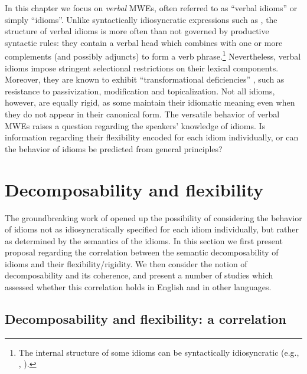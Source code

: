 \documentclass[output=paper]{langsci/langscibook}
\begin{document}
In this chapter we focus on \emph{verbal} MWEs, often referred to as ``verbal idioms'' or simply ``idioms''.
Unlike syntactically idiosyncratic expressions such as , the structure of verbal idioms is more often than not
governed by productive syntactic rules: they contain a verbal head
which combines with one or more complements (and possibly adjuncts) to
form a verb phrase.\footnote{The internal structure of some idioms can be syntactically idiosyncratic (e.g., , ).}
Nevertheless, verbal idioms impose stringent selectional restrictions on
their lexical components. Moreover, they are known to exhibit
``transformational deficiencies'' \citep[p. 111]{chafe1968idiomaticity},
such as resistance to passivization, modification and topicalization. Not
all idioms, however, are equally rigid, as some maintain their idiomatic
meaning even when they do not appear in their canonical form. The versatile behavior of verbal MWEs raises a question regarding the
speakers' knowledge of idioms. Is information regarding their
flexibility encoded for each idiom individually, or can the behavior
of idioms be predicted from general principles?


\section{Decomposability and flexibility}
\label{sec:decomp}

The groundbreaking work of \citet{nunberg94} opened up the possibility
of considering the behavior of idioms not as idiosyncratically specified for
each idiom individually, but rather as determined by the semantics of
the idioms. In this section we first present  proposal regarding the correlation between the semantic decomposability of idioms and their flexibility/rigidity. We then consider the notion of decomposability and its coherence, and present a number of studies which assessed whether this correlation holds in English and in other languages.


\subsection{Decomposability and flexibility: a correlation}
\end{document}
